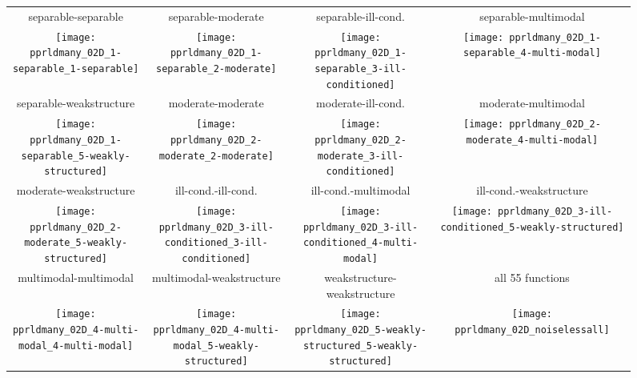 \documentclass{sig-alternate}
\begin{document}
\begin{figure*}
\begin{tabular}{@{\hspace*{-0.009\textwidth}}c@{\hspace*{-0.014\textwidth}}c@{\hspace*{-0.016\textwidth}}c@{\hspace*{-0.02\textwidth}}c}
separable-separable & separable-moderate & separable-ill-cond. & separable-multimodal\\
\texttt{[image: pprldmany\_02D\_1-separable\_1-separable]} &
\texttt{[image: pprldmany\_02D\_1-separable\_2-moderate]} &
\texttt{[image: pprldmany\_02D\_1-separable\_3-ill-conditioned]} &
\texttt{[image: pprldmany\_02D\_1-separable\_4-multi-modal]}\\
separable-weakstructure & moderate-moderate & moderate-ill-cond. & moderate-multimodal\\
\texttt{[image: pprldmany\_02D\_1-separable\_5-weakly-structured]} &
\texttt{[image: pprldmany\_02D\_2-moderate\_2-moderate]} &
\texttt{[image: pprldmany\_02D\_2-moderate\_3-ill-conditioned]} &
\texttt{[image: pprldmany\_02D\_2-moderate\_4-multi-modal]}\\
moderate-weakstructure & ill-cond.-ill-cond. & ill-cond.-multimodal & ill-cond.-weakstructure\\
\texttt{[image: pprldmany\_02D\_2-moderate\_5-weakly-structured]} &
\texttt{[image: pprldmany\_02D\_3-ill-conditioned\_3-ill-conditioned]} &
\texttt{[image: pprldmany\_02D\_3-ill-conditioned\_4-multi-modal]} &
\texttt{[image: pprldmany\_02D\_3-ill-conditioned\_5-weakly-structured]} \\
multimodal-multimodal & multimodal-weakstructure & weakstructure-weakstructure & all 55 functions\\
\texttt{[image: pprldmany\_02D\_4-multi-modal\_4-multi-modal]} &
\texttt{[image: pprldmany\_02D\_4-multi-modal\_5-weakly-structured]} &
\texttt{[image: pprldmany\_02D\_5-weakly-structured\_5-weakly-structured]} &
\texttt{[image: pprldmany\_02D\_noiselessall]}
\vspace*{-0.5ex}
\end{tabular}
 \caption{\label{fig:ECDFsGroupsFive}
 }
\end{figure*}
\end{document}
